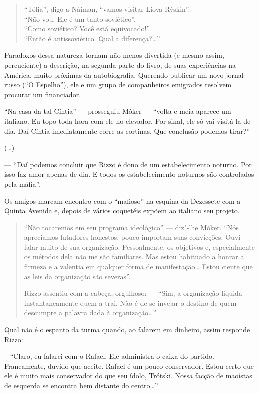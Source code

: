 {\begin{quote}
``Tólia'', digo a Náiman, ``vamos visitar Liova Rýskin''. \\
``Não vou. Ele é um  tanto soviético''. \\
``Como soviético? Você está equivocado!'' \\
``Então é antissoviético. Qual a diferença?\ldots{}''
\end{quote}

Paradoxos dessa natureza tornam não menos divertida (e mesmo assim, percuciente) a descrição, na segunda parte do livro, de suas experiências na América, muito próximas da autobiografia. Querendo publicar um novo jornal russo (``O Espelho''), ele e um grupo de companheiros emigrados resolvem procurar um financiador.

``Na casa da tal Cíntia'' --- prosseguiu Móker --- ``volta e meia aparece um italiano. Eu topo toda hora com ele no elevador. Por sinal, ele só vai visitá-la de dia. Daí Cíntia imediatamente corre as cortinas. Que conclusão podemos tirar?''

(\ldots{})

--- ``Daí podemos concluir que Rizzo é dono de um estabelecimento noturno. Por isso faz amor apenas de dia. E todos os estabelecimento noturnos são controlados pela máfia''.

Os amigos marcam encontro com o ``mafioso'' na esquina da Dezessete com a Quinta Avenida e, depois de vários coquetéis expõem ao italiano seu projeto.

\begin{quote}
``Não tocaremos em seu programa ideológico'' --- diz"-lhe Móker. ``Nós apreciamos lutadores honestos, pouco importam suas convicções. Ouvi falar muito de sua organização. Pessoalmente, os objetivos e, especialmente os métodos dela não me são familiares. Mas estou habituado a honrar a firmeza e a valentia em qualquer forma de manifestação\ldots{} Estou ciente que as leis da organização são severas''.

Rizzo assentiu com a cabeça, orgulhoso: --- ``Sim, a organização liquida instantaneamente quem a trai. Não é de se invejar o destino de quem descumpre a palavra dada à organização\ldots{}''
\end{quote}

Qual não é o espanto da turma quando, ao falarem em dinheiro, assim responde Rizzo:

-- ``Claro, eu falarei com o Rafael. Ele administra o caixa do partido. Francamente, duvido que aceite. Rafael é um pouco conservador. Estou certo que ele é muito mais conservador do que seu ídolo, Trótski. Nossa facção de maoístas de esquerda se encontra bem distante do centro\ldots{}''

}
